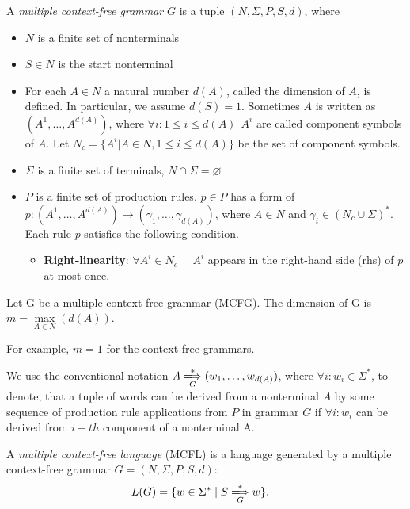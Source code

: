 \begin{definition}A \emph{multiple context-free grammar} $G$ is a tuple $(N, \Sigma, P, S, d)$, where
\begin{itemize}
    \item $N$ is a finite set of nonterminals
    \item $S \in N$ is the start nonterminal 
    \item For each $A \in N$ a natural number $d(A)$, called the dimension of $A$, is defined. In particular, we assume $d(S) = 1$. Sometimes $A$ is written as $(A^1, \dots, A^{d(A)})$, where $\forall i: 1 \leq i \leq d(A) \ \ A^i$ are called component symbols of $A$. Let $N_c = \{A^i | A \in N, 1 \leq i \leq d(A)\}$  be the set of component symbols.
    \item $\Sigma$ is a finite set of terminals, $N \cap \Sigma = \varnothing$
    \item $P$ is a finite set of production rules. $p \in P$ has a form of $ p: (A^1, \dots, A^{d(A)}) \rightarrow (\gamma_1, \dots, \gamma_{d(A)}) $, where $A \in N$ and $\gamma_i \in (N_c \cup \Sigma)^*$. Each rule $p$ satisfies the following condition.
    \begin{itemize}
        \item \textbf{Right-linearity}: $\forall A^i \in N_c$ \ \ $A^i$ appears in the right-hand side (rhs) of $p$ at most once.
    \end{itemize}
\end{itemize} 
\end{definition}

\begin{definition}
    Let G be a multiple context-free grammar (MCFG). The dimension of G is $m =  \max\limits_{A \in N}(d(A))$.
\end{definition}
For example, $m = 1$ for the context-free grammars.

We use the conventional notation $A \xLongrightarrow[G]{*} (w_1, \dots, w_{d(A)})$, where $\forall i: w_i \in \Sigma^*$, to denote, that a tuple of
words can be derived from a nonterminal $A$ by some sequence of production rule applications from $P$ in grammar $G$ if $\forall i: w_i$ can be derived from $i-th$ component of a nonterminal A.

\begin{definition} A \emph{multiple context-free language} (MCFL) is a language generated by a multiple context-free grammar $G=(N, \Sigma, P, S, d)$:
\begin{align*}
    L(G) &= \{w \in \Sigma^* \mid S \xLongrightarrow[G]{*} w \}.
\end{align*}
\end{definition}

